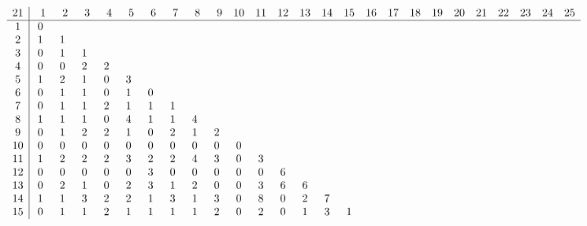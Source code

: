 \begin{landscape}
\[
\begin{array}{c|ccccccccccccccccccccccccc}\addcontentsline{lot}{table}{\protect\numberline{}Dimensions of the Kernel of $\mathcal{L}_{r,c,21}$}
21&  \phantom{0}1&  \phantom{0}2&  \phantom{0}3&  \phantom{0}4&  \phantom{0}5&  \phantom{0}6&  \phantom{0}7&  \phantom{0}8&  \phantom{0}9& 10& 11& 12& 13& 14& 15& 16& 17& 18& 19& 20& 21& 22& 23& 24& 25\\
\hline
 1&  0&   &   &   &   &   &   &   &   &   &   &   &   &   &   &   &   &   &   &   &   &   &   &   &   \\
 2&  1&  1&   &   &   &   &   &   &   &   &   &   &   &   &   &   &   &   &   &   &   &   &   &   &   \\
 3&  0&  1&  1&   &   &   &   &   &   &   &   &   &   &   &   &   &   &   &   &   &   &   &   &   &   \\
 4&  0&  0&  2&  2&   &   &   &   &   &   &   &   &   &   &   &   &   &   &   &   &   &   &   &   &   \\
 5&  1&  2&  1&  0&  3&   &   &   &   &   &   &   &   &   &   &   &   &   &   &   &   &   &   &   &   \\
 6&  0&  1&  1&  0&  1&  0&   &   &   &   &   &   &   &   &   &   &   &   &   &   &   &   &   &   &   \\
 7&  0&  1&  1&  2&  1&  1&  1&   &   &   &   &   &   &   &   &   &   &   &   &   &   &   &   &   &   \\
 8&  1&  1&  1&  0&  4&  1&  1&  4&   &   &   &   &   &   &   &   &   &   &   &   &   &   &   &   &   \\
 9&  0&  1&  2&  2&  1&  0&  2&  1&  2&   &   &   &   &   &   &   &   &   &   &   &   &   &   &   &   \\
10&  0&  0&  0&  0&  0&  0&  0&  0&  0&  0&   &   &   &   &   &   &   &   &   &   &   &   &   &   &   \\
11&  1&  2&  2&  2&  3&  2&  2&  4&  3&  0&  3&   &   &   &   &   &   &   &   &   &   &   &   &   &   \\
12&  0&  0&  0&  0&  0&  3&  0&  0&  0&  0&  0&  6&   &   &   &   &   &   &   &   &   &   &   &   &   \\
13&  0&  2&  1&  0&  2&  3&  1&  2&  0&  0&  3&  6&  6&   &   &   &   &   &   &   &   &   &   &   &   \\
14&  1&  1&  3&  2&  2&  1&  3&  1&  3&  0&  8&  0&  2&  7&   &   &   &   &   &   &   &   &   &   &   \\
15&  0&  1&  1&  2&  1&  1&  1&  1&  2&  0&  2&  0&  1&  3&  1&   &   &   &   &   &   &   &   &   &   \\

\end{array}\]
\end{landscape}
